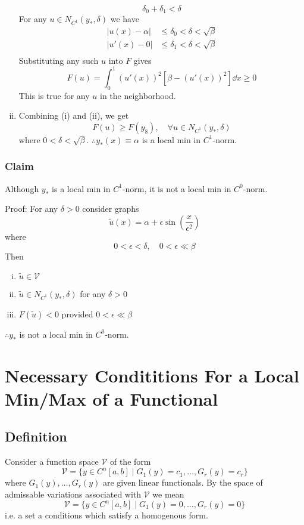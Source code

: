 \documentclass[12pt,twoside]{article}
\begin{document}
\begin{enumerate}[(i)]
  $$\delta_0+\delta_1<\delta$$
  For any $u\in N_{C^1}(y_*,\delta)$ we have
  \begin{align*}
    |u(x)-\alpha| &\le \delta_0 < \delta < \sqrt{\beta} \\
    |u'(x)-0| &\le \delta_1 < \delta < \sqrt{\beta} \\
  \end{align*}
  Substituting any such $u$ into $F$ gives
  \begin{equation*}
    F(u) = \int_0^1{(u'(x))}^2[\beta-{(u'(x))}^2]\dd{x} \ge 0
  \end{equation*}
  This is true for any $u$ in the neighborhood.
\item Combining (i) and (ii), we get
  \begin{equation*}
    F(u) \ge F(y_8),\quad \forall u\in N_{C^1}(y_*,\delta)
  \end{equation*}
  where $0<\delta<\sqrt{\beta}$. $\therefore y_*(x)\equiv\alpha$ is a local min
  in $C^1$-norm.
\end{enumerate}

\subsubsection*{Claim}
Although $y_*$ is a local min in $C^1$-norm, it is not a local min in
$C^0$-norm.

Proof: For any $\delta>0$ consider graphs
$$\tilde{u}(x)=\alpha+\epsilon\sin\left( \frac{x}{\epsilon^2} \right)$$
where
$$0<\epsilon<\delta,\quad 0<\epsilon\ll \beta$$
Then
\begin{enumerate}[(i)]
\item $\tilde{u}\in\mathcal{V}$
\item $\tilde{u}\in N_{C^1}(y_*,\delta)$ for any $\delta>0$
\item $F(\tilde{u})<0$ provided $0<\epsilon\ll\beta$
\end{enumerate}
$\therefore y_*$  is not a local min in $C^0$-norm.

\section{Necessary Condititions For a Local Min/Max of a Functional}
\subsection{Definition}
Consider a function space $\mathcal{V}$ of the form
\begin{equation*}
  \mathcal{V} = \{y\in C^n[a,b]\;|\;G_1(y)=c_1,\ldots,G_r(y)=c_r\}
\end{equation*}
where $G_1(y),\ldots,G_r(y)$ are given linear functionals. By the space of
admissable variations associated with $\mathcal{V}$ we mean
\begin{equation*}
  \mathcal{V} = \{y\in C^n[a,b]\;|\;G_1(y)=0,\ldots,G_r(y)=0\}
\end{equation*}
i.e. a set a conditions which satisfy a homogenous form.
\end{document}
